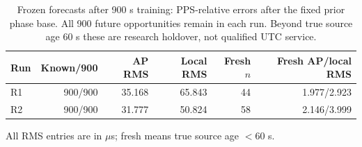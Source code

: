
\begin{table}[t]\centering\small
\caption{Frozen forecasts after 900 s training: PPS-relative errors after the fixed prior phase base. All 900 future opportunities remain in each run. Beyond true source age 60 s these are research holdover, not qualified UTC service.}
\label{tab:hybrid-frozen}\begin{tabular}{lrrrrr}\toprule
Run & Known/900 & AP RMS & Local RMS & Fresh $n$ & Fresh AP/local RMS \\ \midrule
R1 & 900/900 & 35.168 & 65.843 & 44 & 1.977/2.923 \\
R2 & 900/900 & 31.777 & 50.824 & 58 & 2.146/3.999 \\
\bottomrule\end{tabular}
\par\smallskip All RMS entries are in $\mu$s; fresh means true source age $<60$ s.

\end{table}
